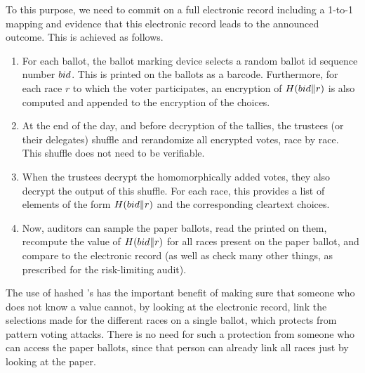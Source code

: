 To this purpose, we need to commit on a full electronic record
including a 1-to-1 mapping and evidence that this electronic record
leads to the announced outcome.
%
This is achieved as follows.
\begin{enumerate}
\item For each ballot, the ballot marking device selects a random ballot id sequence number
${bid}$. This \bid is printed on the ballots as a barcode. Furthermore,
for each race $r$ to which the voter participates, an encryption of
$H({bid} \| r)$ is also computed and appended to the encryption of the
choices.
\item At the end of the day, and before decryption of the tallies, the
  trustees (or their delegates) shuffle and rerandomize all encrypted
  votes, race by race. This shuffle does not need to be verifiable.
\item When the trustees decrypt the homomorphically added votes, they
  also decrypt the output of this shuffle. For each race, this
  provides a list of elements of the form $H({bid} \| r)$ and the
  corresponding cleartext choices.
\item Now, auditors can sample the paper ballots, read the \bid
  printed on them, recompute the value of $H({bid} \| r)$ for all races
  present on the paper ballot, and compare to the electronic record
  (as well as check many other things, as prescribed for the
  risk-limiting audit).
\end{enumerate}

The use of hashed \bid's has the important benefit of making sure that
someone who does not know a \bid value cannot, by looking at the
electronic record, link the selections made for the different races on
a single ballot, which protects from pattern voting attacks. There is
no need for such a protection from someone who can access the paper
ballots, since that person can already link all races just by looking
at the paper.

